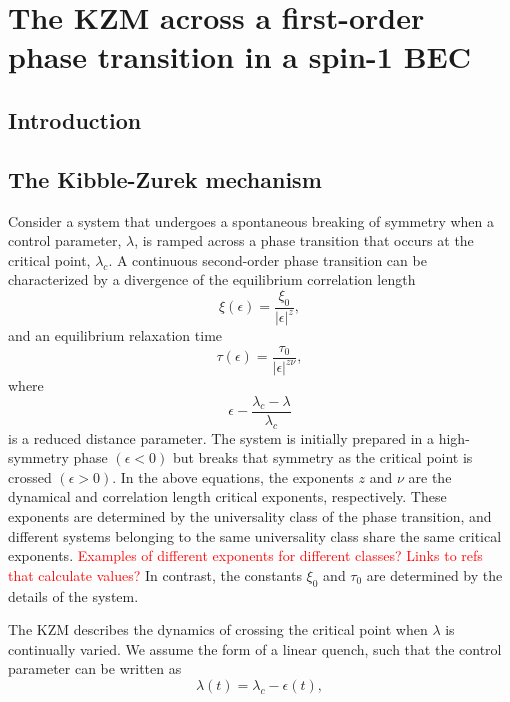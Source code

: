 \chapter{The KZM across a first-order phase transition in a spin-1 BEC}


\section{Introduction}

\section{The Kibble-Zurek mechanism}
Consider a system that undergoes a spontaneous breaking of symmetry when a
control parameter, $\lambda$, is ramped across a phase transition that occurs
at the critical point, $\lambda_c$.
A continuous second-order phase transition can be characterized by a divergence
of the equilibrium correlation length
\begin{equation}
    \xi(\epsilon) = \frac{\xi_0}{|\epsilon|^z},
\end{equation}
and an equilibrium relaxation time
\begin{equation}
    \tau(\epsilon) = \frac{\tau_0}{|\epsilon|^{z\nu}},
    \label{eq:equil-relax-time}
\end{equation}
where
\begin{equation}
    \epsilon - \frac{\lambda_c - \lambda}{\lambda_c}
\end{equation}
is a reduced distance parameter.
The system is initially prepared in a high-symmetry phase $(\epsilon < 0)$ but 
breaks that symmetry as the critical point is crossed $(\epsilon > 0)$.
In the above equations, the exponents $z$ and $\nu$ are the dynamical and
correlation length critical exponents, respectively.
These exponents are determined by the universality class of the phase
transition, and different systems belonging to the same universality class share
the same critical exponents.
\textcolor{red}{Examples of different exponents for different classes? Links
to refs that calculate values?}
In contrast, the constants $\xi_0$ and $\tau_0$ are determined by the details
of the system. \par
The KZM describes the dynamics of crossing the critical point when $\lambda$ 
is continually varied.
We assume the form of a linear quench, such that the control parameter can be
written as
\begin{equation}
    \lambda(t) = \lambda_c - \epsilon(t),
\end{equation}
